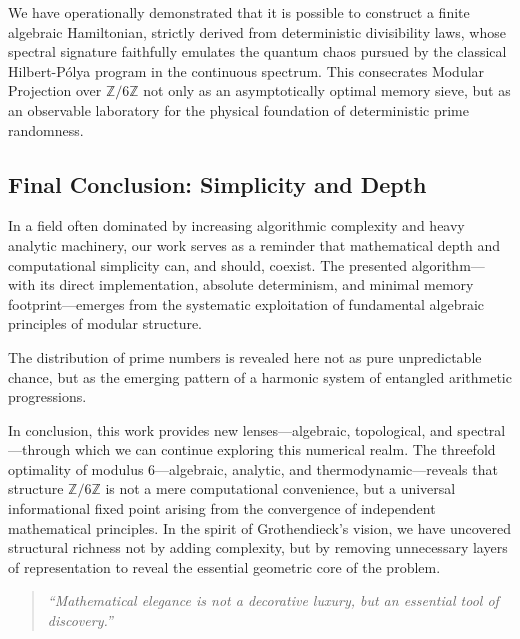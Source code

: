 \documentclass{article}
\numberwithin{equation}{section}
\theoremstyle{plain}
\theoremstyle{definition}
\begin{document}
We have operationally demonstrated that it is possible to construct a finite algebraic Hamiltonian, strictly derived from deterministic divisibility laws, whose spectral signature faithfully emulates the quantum chaos pursued by the classical Hilbert-Pólya program in the continuous spectrum. This consecrates Modular Projection over $\mathbb{Z}/6\mathbb{Z}$ not only as an asymptotically optimal memory sieve, but as an observable laboratory for the physical foundation of deterministic prime randomness.

\subsection{Final Conclusion: Simplicity and Depth}

In a field often dominated by increasing algorithmic complexity and heavy analytic machinery, our work serves as a reminder that mathematical depth and computational simplicity can, and should, coexist. The presented algorithm—with its direct implementation, absolute determinism, and minimal memory footprint—emerges from the systematic exploitation of fundamental algebraic principles of modular structure.

The distribution of prime numbers is revealed here not as pure unpredictable chance, but as the emerging pattern of a harmonic system of entangled arithmetic progressions.

In conclusion, this work provides new lenses—algebraic, topological, and spectral—through which we can continue exploring this numerical realm. The threefold optimality of modulus 6—algebraic, analytic, and thermodynamic—reveals that structure $\mathbb{Z}/6\mathbb{Z}$ is not a mere computational convenience, but a universal informational fixed point arising from the convergence of independent mathematical principles. In the spirit of Grothendieck's vision, we have uncovered structural richness not by adding complexity, but by removing unnecessary layers of representation to reveal the essential geometric core of the problem.

\begin{quote}
\textit{``Mathematical elegance is not a decorative luxury, but an essential tool of discovery.''}
\end{quote}

\end{document}
